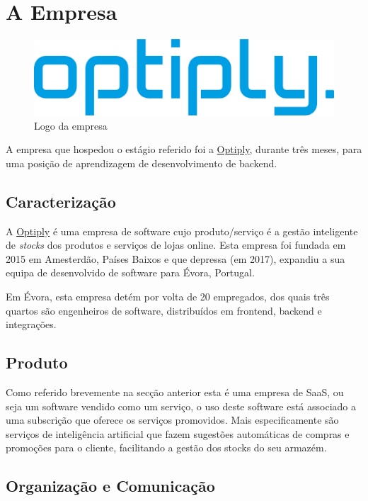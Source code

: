 \chapter{A Empresa}\label{cap2}

\begin{figure}[!hbt]
  \centering
  \includegraphics[width=12cm]{figuras/optiply_logo.png}
  \caption{Logo da empresa}
  \label{fig:logo}
\end{figure}
\FloatBarrier

A empresa que hospedou o estágio referido foi a \href{https://optiply.nl/}{Optiply}, durante três meses, para uma posição de aprendizagem de desenvolvimento de backend.

\section{Caracterização}

A \href{https://optiply.nl/}{Optiply} é uma empresa de software cujo produto/serviço é a gestão inteligente de \textit{stocks} dos produtos e serviços de lojas online. \cite{optiply} Esta empresa foi fundada em 2015 em Amesterdão, Países Baixos e que depressa (em 2017), expandiu a sua equipa de desenvolvido de software para Évora, Portugal.

Em Évora, esta empresa detém por volta de 20 empregados, dos quais três quartos são engenheiros de software, distribuídos em frontend, backend e integrações.

\section{Produto}

Como referido brevemente na secção anterior esta é uma empresa de SaaS, ou seja um software vendido como um serviço, o uso deste software está associado a uma subscrição que oferece os serviços promovidos. Mais especificamente são serviços de inteligência artificial que fazem sugestões automáticas de compras e promoções para o cliente, facilitando a gestão dos stocks do seu armazém.

\newpage

\section{Organização e Comunicação}


